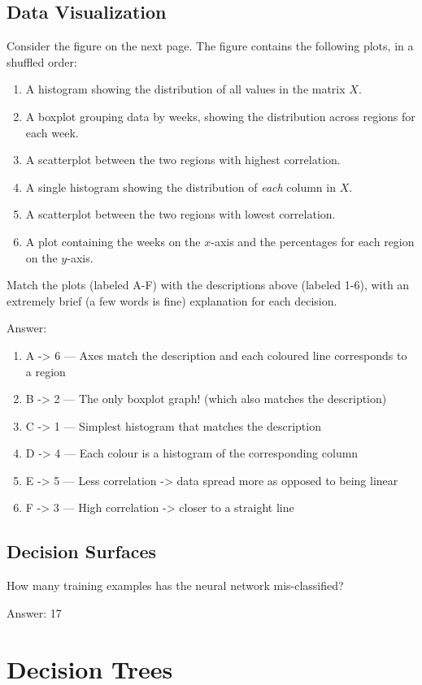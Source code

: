 \documentclass{article}
\def\ans#1{\par\gre{Answer: #1}}
\def\blu#1{{\color{blu}#1}}
\def\gre#1{{\color{gre}#1}}
\def\enum#1{\begin{enumerate}#1\end{enumerate}}
\begin{document}
\subsection{Data Visualization}

Consider the figure on the next page.
The figure contains the following plots, in a shuffled order:
\enum{
\item A histogram showing the distribution of all values in the matrix $X$.
\item A boxplot grouping data by weeks, showing the distribution across regions for each week.
\item A scatterplot between the two regions with highest correlation.
\item A single histogram showing the distribution of \emph{each} column in $X$.
\item A scatterplot between the two regions with lowest correlation.
\item A plot containing the weeks on the $x$-axis and the percentages for each region on the $y$-axis.
}
\blu{Match the plots (labeled A-F) with the descriptions above (labeled 1-6), with an extremely brief (a few words is fine) explanation for each decision.}

\ans{
	\begin{enumerate}
		\item A -> 6 --- Axes match the description and each coloured line corresponds to a region
		\item B -> 2 --- The only boxplot graph! (which also matches the description)
		\item C -> 1 --- Simplest histogram that matches the description
		\item D -> 4 --- Each colour is a histogram of the corresponding column
		\item E -> 5 --- Less correlation -> data spread more as opposed to being linear
		\item F -> 3 --- High correlation -> closer to a straight line
	\end{enumerate}
}

\subsection{Decision Surfaces}

\blu{How many training examples has the neural network mis-classified?}
\ans{
	17
}


\section{Decision Trees}
\end{document}
